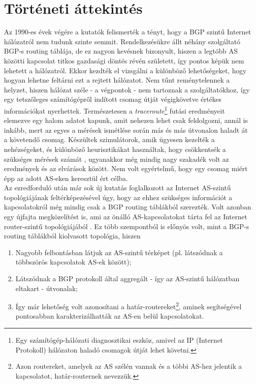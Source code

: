   \section{Történeti áttekintés}\label{section_tortenelem}

  Az 1990-es évek végére a kutatók felismerték a tényt, hogy a BGP szintű Internet hálózatról nem tudunk szinte semmit. Rendelkezésükre állt néhány szolgáltató BGP-s routing táblája, de ez nagyon kevésnek bizonyult, hiszen a legtöbb AS közötti kapcsolat titkos gazdasági döntés révén született, így pontos képük nem lehetett a hálózatról. Ekkor kezdték el vizsgálni a különböző lehetőségeket, hogy hogyan lehetne feltárni ezt a rejtett hálózatot. Nem tűnt reménytelennek a helyzet, hiszen hálózat széle - a végpontok - nem tartoznak a szolgáltatókhoz, így egy tetszőleges számítógépről indított csomag útját végigkövetve értékes információkat nyerhettek. Természetesen a \emph{traceroute}\footnote{Egy számítógép-hálózati diagnosztikai eszköz, amivel az IP (Internet Protokoll) hálózaton haladó csomagok útját lehet követni.} futási eredményeit elemezve egy halom adatot kapunk, amit nehezen lehet csak feldolgozni, annál is inkább, mert az egyes a mérések ismétlése során más és más útvonalon haladt át a követendő csomag. Készültek szimulátorok, amik ügyesen kezelték a nehézségeket, és különböző heurisztikákat használtak, hogy csökkentsék a szükséges mérések számát \cite{Heuristics_for_Internet_Map_Discovery}, ugyanakkor még mindig nagy szakadék volt az eredmények és az elvárások között. Nem volt egyértelmű, hogy egy csomag miért épp az adott AS-eken keresztül ért célba.\\

  Az ezredforduló után már sok új kutatás foglalkozott az Internet AS-szintű topológiájának feltérképezésével úgy, hogy az ehhez szükséges információt a kapcsolatokról még mindig csak a BGP routing táblákból szerezték. Volt azonban egy újfajta megközelítést is, ami az önálló AS-kapcsolatokat tárta fel az Internet router-szintű topológiájából \cite{Inferring_AS_level_Internet_Topology_from_Router_Level_Path_Traces}. Ez több szempontból is előnyös volt, mint a BGP-s routing táblákból kiolvasott topológia, hiszen
  \begin{enumerate}
    \item Nagyobb felbontásban látjuk az AS-szintű térképet (pl. látszódnak a többszörös kapcsolatok AS-ek között);
    \item Látszódnak a BGP protokoll által aggregált - így az AS-szintű hálózatban eltakart - útvonalak;
    \item Így már lehetőség volt azonosítani a határ-routereket\footnote{Azon routereket, amelyek az AS szélén vannak és a többi AS-hez jelentik a kapcsolatot, határ-routernek nevezzük.}, aminek segítségével pontosabban karakterizálhatták az AS-en belül kapcsolatokat.
  \end{enumerate}

